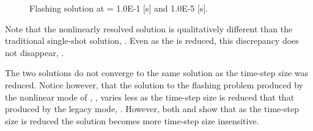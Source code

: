 \begin{figure}[h!t]
\centering
{}
\caption[Flashing solution at \dtmax{} = 1.0E-1 {[s]}and 1.0E-5 {[s]}]{Flashing solution at \dtmax{} = 1.0E-1 {[s]} and 1.0E-5 {[s]}.}
\label{fig:flashing_compare_1}
\end{figure}

Note that the nonlinearly resolved solution is qualitatively different than the traditional single-shot solution, .
Even as the \dtmax{} is reduced, this discrepancy does not disappear, .

The two solutions do not converge to the same solution as the time-step size was reduced.
Notice however, that the solution to the flashing problem produced by the nonlinear mode of \cobra{}, , varies less as the time-step size is reduced that that produced by the legacy mode, .
However, both  and  show that as the time-step size is reduced the solution becomes more time-step size insensitive.

